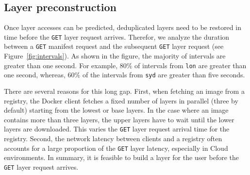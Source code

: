 %
%
%
%



\subsection{Layer preconstruction}
\label{sec:layer-preconstruction}


%

Once layer accesses can be predicted, deduplicated layers need to be restored
in time before the \texttt{GET} layer request arrives.
%
%
Therefor, we analyze the duration between a \texttt{GET} manifest request and the subsequent
\texttt{GET} layer request (see Figure~\ref{fig:intervals}).
%
As shown in the figure, the majority of intervals are greater than one second.
%
For example, 80\% of intervals from \texttt{lon} are greater than one second,
whereas, 60\% of the intervals from \texttt{syd} are greater than five seconds. 
%

There are several reasons for this long gap.
%
First, when fetching an image from a registry,
the Docker client fetches a fixed number of layers in parallel (three by
default) starting from the lowest or base layers.
%
In the case where an image
contains more than three layers, the upper layers have to wait until the
lower layers are downloaded.
%
This varies the \texttt{GET} layer request arrival time for the registry.
%
Second, the network latency between clients and a registry
often accounts for a large proportion of the \texttt{GET} layer latency,
especially in Cloud environments.
%
In summary, it is feasible to build a layer for the user before
the \texttt{GET} layer request arrives.


